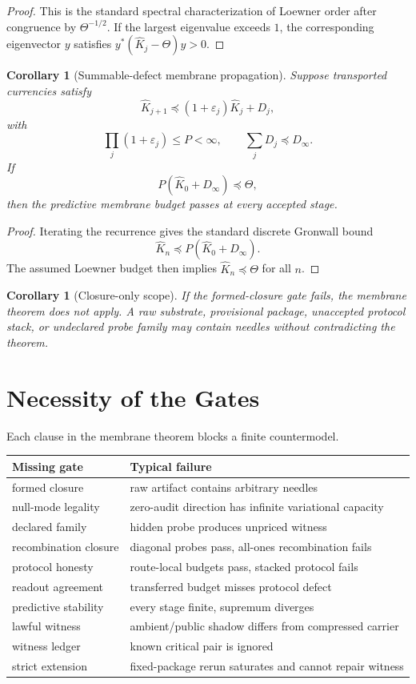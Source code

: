 \documentclass[11pt]{article}
\newtheorem{corollary}[theorem]{Corollary}
\begin{document}
\begin{proof}
This is the standard spectral characterization of Loewner order after congruence by $\Theta^{-1/2}$.  If the largest eigenvalue exceeds $1$, the corresponding eigenvector $y$ satisfies $y^*(\widehat K_j-\Theta)y>0$.
\end{proof}

\begin{corollary}[Summable-defect membrane propagation]
Suppose transported currencies satisfy
\[
  \widehat K_{j+1}\preceq(1+\varepsilon_j)\widehat K_j+D_j,
\]
with
\[
  \prod_j(1+\varepsilon_j)\le P<\infty,
  \qquad
  \sum_jD_j\preceq D_\infty.
\]
If
\[
  P(\widehat K_0+D_\infty)\preceq\Theta,
\]
then the predictive membrane budget passes at every accepted stage.
\end{corollary}

\begin{proof}
Iterating the recurrence gives the standard discrete Gronwall bound
\[
  \widehat K_n\preceq P(\widehat K_0+D_\infty).
\]
The assumed Loewner budget then implies $\widehat K_n\preceq\Theta$ for all $n$.
\end{proof}

\begin{corollary}[Closure-only scope]
If the formed-closure gate fails, the membrane theorem does not apply.  A raw substrate, provisional package, unaccepted protocol stack, or undeclared probe family may contain needles without contradicting the theorem.
\end{corollary}

\section{Necessity of the Gates}
Each clause in the membrane theorem blocks a finite countermodel.
\begin{center}
\begin{tabular}{ll}
\toprule
Missing gate & Typical failure \\
\midrule
formed closure & raw artifact contains arbitrary needles \\
null-mode legality & zero-audit direction has infinite variational capacity \\
declared family & hidden probe produces unpriced witness \\
recombination closure & diagonal probes pass, all-ones recombination fails \\
protocol honesty & route-local budgets pass, stacked protocol fails \\
readout agreement & transferred budget misses protocol defect \\
predictive stability & every stage finite, supremum diverges \\
lawful witness & ambient/public shadow differs from compressed carrier \\
witness ledger & known critical pair is ignored \\
strict extension & fixed-package rerun saturates and cannot repair witness \\
\bottomrule
\end{tabular}
\end{center}
\end{document}
